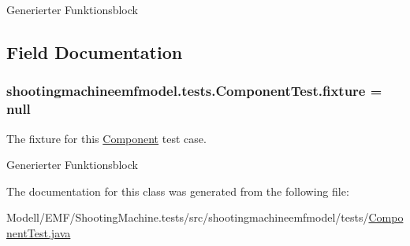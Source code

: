 Generierter Funktionsblock 

\subsection{Field Documentation}
\hypertarget{classshootingmachineemfmodel_1_1tests_1_1_component_test_a6d7e17f0c843bc946df4aa31a0f405c6}{
\subsubsection[{fixture}]{ shootingmachineemfmodel.\-tests.\-Component\-Test.\-fixture = null\hspace{0.3cm}{\ttfamily [protected]}}}\label{classshootingmachineemfmodel_1_1tests_1_1_component_test_a6d7e17f0c843bc946df4aa31a0f405c6}
The fixture for this \hyperlink{interfaceshootingmachineemfmodel_1_1_component}{Component} test case.

Generierter Funktionsblock 

The documentation for this class was generated from the following file\-:\begin{DoxyCompactItemize}
\item 
Modell/\-E\-M\-F/\-Shooting\-Machine.\-tests/src/shootingmachineemfmodel/tests/\hyperlink{_component_test_8java}{Component\-Test.\-java}\end{DoxyCompactItemize}

